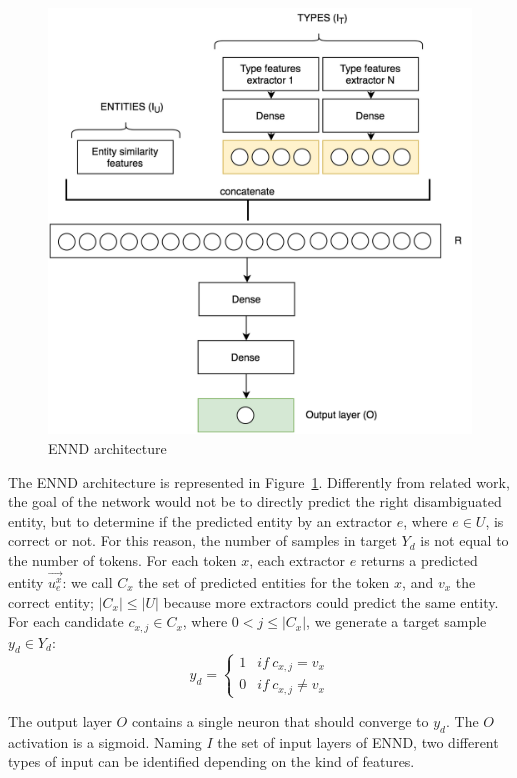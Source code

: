 \documentclass{llncs}
\newcommand{\figref}[1]{\mbox{Figure~\ref{#1}}}
\begin{document}
\begin{figure}[!ht]
	\centering
    	\includegraphics[scale=0.25]{NN_disambiguation.png}
 	\caption{ENND architecture}
 	\label{fig:NN_disambiguation}
\end{figure}

The ENND architecture is represented in \figref{fig:NN_disambiguation}. Differently from related work, the goal of the network would not be to directly predict the right disambiguated entity, but to determine if the predicted entity by an extractor $e$, where $e \in U$, is correct or not. For this reason, the number of samples in target $Y_d$ is not equal to the number of tokens. For each token $x$, each extractor $e$ returns a predicted entity $\vec{u^{x}_{e}}$: we call $C_x$ the set of predicted entities for the token $x$, and  $v_x$ the correct entity; $\left\vert{C_x}\right\vert \leq \left\vert{U}\right\vert$ because more extractors could predict the same entity.
For each candidate $c_{x,j} \in C_x$, where $0 < j \leq \left\vert{C_x}\right\vert$, we generate a target sample $y_d \in Y_d$:
$$y_d  = \left\{\begin{matrix} 
1 & if \: c_{x,j} =  v_x\\
0 & if \: c_{x,j} \neq v_x
\end{matrix}\right.$$

The output layer $O$ contains a single neuron that should converge to $y_d$. The $O$ activation is a sigmoid. Naming $I$ the set of input layers of ENND, two different types of input can be identified depending on the kind of features.
\end{document}
